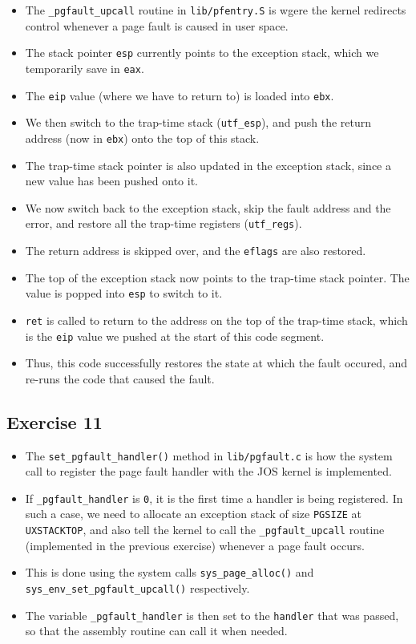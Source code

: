 \documentclass[]{article}
\begin{document}
\begin{itemize}
\itemsep1pt\parskip0pt
\item
  The \texttt{\_pgfault\_upcall} routine in \texttt{lib/pfentry.S} is
  wgere the kernel redirects control whenever a page fault is caused in
  user space.
\item
  The stack pointer \texttt{esp} currently points to the exception
  stack, which we temporarily save in \texttt{eax}.
\item
  The \texttt{eip} value (where we have to return to) is loaded into
  \texttt{ebx}.
\item
  We then switch to the trap-time stack (\texttt{utf\_esp}), and push
  the return address (now in \texttt{ebx}) onto the top of this stack.
\item
  The trap-time stack pointer is also updated in the exception stack,
  since a new value has been pushed onto it.
\item
  We now switch back to the exception stack, skip the fault address and
  the error, and restore all the trap-time registers
  (\texttt{utf\_regs}).
\item
  The return address is skipped over, and the \texttt{eflags} are also
  restored.
\item
  The top of the exception stack now points to the trap-time stack
  pointer. The value is popped into \texttt{esp} to switch to it.
\item
  \texttt{ret} is called to return to the address on the top of the
  trap-time stack, which is the \texttt{eip} value we pushed at the
  start of this code segment.
\item
  Thus, this code successfully restores the state at which the fault
  occured, and re-runs the code that caused the fault.
\end{itemize}

\subsection{Exercise 11}

\begin{itemize}
\itemsep1pt\parskip0pt
\item
  The \texttt{set\_pgfault\_handler()} method in \texttt{lib/pgfault.c}
  is how the system call to register the page fault handler with the JOS
  kernel is implemented.
\item
  If \texttt{\_pgfault\_handler} is \texttt{0}, it is the first time a
  handler is being registered. In such a case, we need to allocate an
  exception stack of size \texttt{PGSIZE} at \texttt{UXSTACKTOP}, and
  also tell the kernel to call the \texttt{\_pgfault\_upcall} routine
  (implemented in the previous exercise) whenever a page fault occurs.
\item
  This is done using the system calls \texttt{sys\_page\_alloc()} and
  \texttt{sys\_env\_set\_pgfault\_upcall()} respectively.
\item
  The variable \texttt{\_pgfault\_handler} is then set to the
  \texttt{handler} that was passed, so that the assembly routine can
  call it when needed.
\end{itemize}
\end{document}
